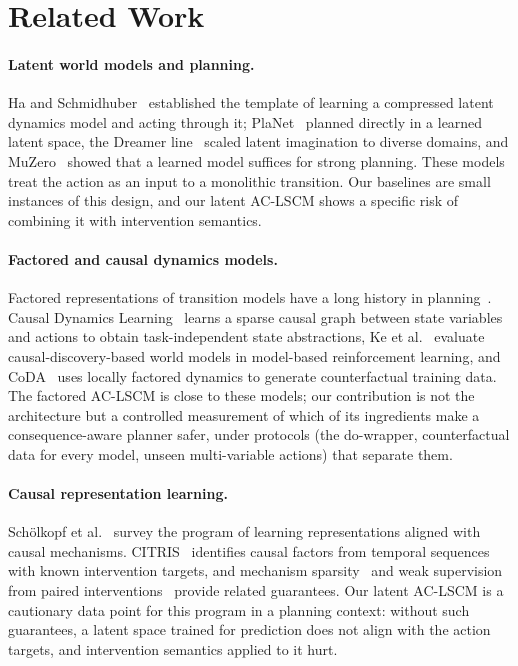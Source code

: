 \section{Related Work}

\paragraph{Latent world models and planning.}
Ha and Schmidhuber~\citep{ha2018world} established the template of learning a
compressed latent dynamics model and acting through it; PlaNet~\citep{hafner2019planet}
planned directly in a learned latent space, the Dreamer line~\citep{hafner2023dreamerv3}
scaled latent imagination to diverse domains, and MuZero~\citep{schrittwieser2020muzero}
showed that a learned model suffices for strong planning. These models treat
the action as an input to a monolithic transition. Our baselines are small
instances of this design, and our latent AC-LSCM shows a specific risk of
combining it with intervention semantics.

\paragraph{Factored and causal dynamics models.}
Factored representations of transition models have a long history in
planning~\citep{boutilier2000factored}. Causal Dynamics
Learning~\citep{wang2022cdl} learns a sparse causal graph between state
variables and actions to obtain task-independent state abstractions, Ke et
al.~\citep{ke2021systematic} evaluate causal-discovery-based world models in
model-based reinforcement learning, and CoDA~\citep{pitis2020coda} uses
locally factored dynamics to generate counterfactual training data. The
factored AC-LSCM is close to these models; our contribution is not the
architecture but a controlled measurement of which of its ingredients make a
consequence-aware planner safer, under protocols (the do-wrapper,
counterfactual data for every model, unseen multi-variable actions) that
separate them.

\paragraph{Causal representation learning.}
Sch\"olkopf et al.~\citep{scholkopf2021causal} survey the program of learning
representations aligned with causal mechanisms. CITRIS~\citep{lippe2022citris}
identifies causal factors from temporal sequences with known intervention
targets, and mechanism sparsity~\citep{lachapelle2022disentanglement} and weak
supervision from paired interventions~\citep{brehmer2022weakly} provide related
guarantees. Our latent AC-LSCM is a cautionary data point for this program in
a planning context: without such guarantees, a latent space trained for
prediction does not align with the action targets, and intervention
semantics applied to it hurt.


